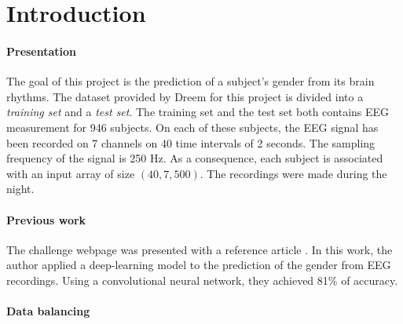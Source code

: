 \section{Introduction}

\paragraph{Presentation}The goal of this project is the prediction of a subject's gender from its brain rhythms.
The dataset provided by Dreem for this project is divided into a \textit{training set} and a \textit{test set}. The training set and the test set both contains EEG measurement for 946 subjects. On each of these subjects, the EEG signal has been recorded on 7 channels on 40 time intervals of 2 seconds. The sampling frequency of the signal is 250 Hz. As a consequence, each subject is associated with an input array of size $(40, 7, 500)$. The recordings were made during the night.   

\paragraph{Previous work}

The challenge webpage was presented with a reference article \cite{nature_original}. In this work, the author applied a deep-learning model to the prediction of the gender from EEG recordings. Using a convolutional neural network, they achieved 81\% of accuracy. 

\paragraph{Data balancing}